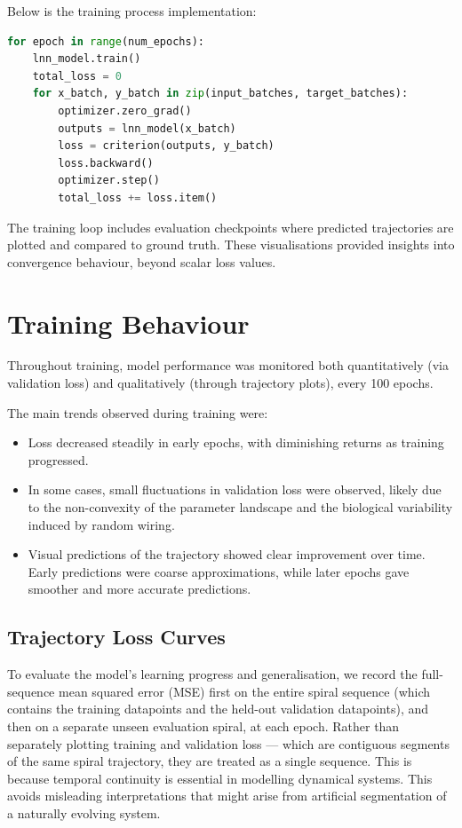 Below is the training process implementation:
\begin{lstlisting}[language=Python, caption={Simplified training loop for the LNN}]
for epoch in range(num_epochs):
    lnn_model.train()
    total_loss = 0
    for x_batch, y_batch in zip(input_batches, target_batches):
        optimizer.zero_grad()
        outputs = lnn_model(x_batch)
        loss = criterion(outputs, y_batch)
        loss.backward()
        optimizer.step()
        total_loss += loss.item()
\end{lstlisting}

The training loop includes evaluation checkpoints where predicted trajectories are plotted and compared to ground truth. These visualisations provided insights into convergence behaviour, beyond scalar loss values.

\section{Training Behaviour}
Throughout training, model performance was monitored both quantitatively (via validation loss) and qualitatively (through trajectory plots), every 100 epochs.

\noindent The main trends observed during training were:
\begin{itemize}
    \item Loss decreased steadily in early epochs, with diminishing returns as training progressed.
    \item In some cases, small fluctuations in validation loss were observed, likely due to the non-convexity of the parameter landscape and the biological variability induced by random wiring.
    \item Visual predictions of the trajectory showed clear improvement over time. Early predictions were coarse approximations, while later epochs gave smoother and more accurate predictions.
\end{itemize}

\subsection*{Trajectory Loss Curves}
To evaluate the model's learning progress and generalisation, we record the full-sequence mean squared error (MSE) first on the entire spiral sequence (which contains the training datapoints and the held-out validation datapoints), and then on a separate unseen evaluation spiral, at each epoch. Rather than separately plotting training and validation loss — which are contiguous segments of the same spiral trajectory, they are treated as a single sequence. This is because temporal continuity is essential in modelling dynamical systems. This avoids misleading interpretations that might arise from artificial segmentation of a naturally evolving system.

